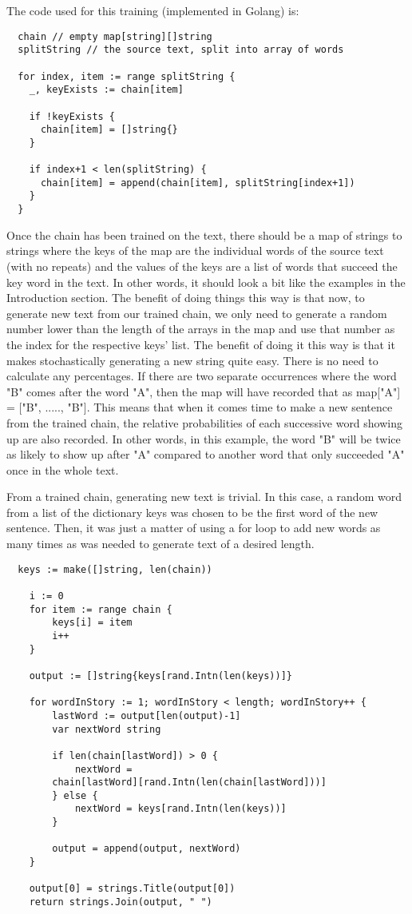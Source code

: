 \documentclass[11pt, a4paper]{article}
\begin{document}
  The code used for this training (implemented in Golang) is: \newline

  \begin{lstlisting}
  chain // empty map[string][]string
  splitString // the source text, split into array of words

  for index, item := range splitString {
    _, keyExists := chain[item]

    if !keyExists {
      chain[item] = []string{}
    }

    if index+1 < len(splitString) {
      chain[item] = append(chain[item], splitString[index+1])
    }
  }
  \end{lstlisting}

  Once the chain has been trained on the text, there should be a map of strings to strings where the keys of the map are the individual words of the source text (with no repeats) and the values of the keys are a list of words that succeed the key word in the text. In other words, it should look a bit like the examples in the Introduction section. The benefit of doing things this way is that now, to generate new text from our trained chain, we only need to generate a random number lower than the length of the arrays in the map and use that number as the index for the respective keys' list. The benefit of doing it this way is that it makes stochastically generating a new string quite easy. There is no need to calculate any percentages. If there are two separate occurrences where the word "B" comes after the word "A", then the map will have recorded that as map["A"] = ["B", ....., "B"]. This means that when it comes time to make a new sentence from the trained chain, the relative probabilities of each successive word showing up are also recorded. In other words, in this example, the word "B" will be twice as likely to show up after "A" compared to another word that only succeeded "A" once in the whole text.

  From a trained chain, generating new text is trivial. In this case, a random word from a list of the dictionary keys was chosen to be the first word of the new sentence. Then, it was just a matter of using a for loop to add new words as many times as was needed to generate text of a desired length.

  \begin{lstlisting}
  keys := make([]string, len(chain))

	i := 0
	for item := range chain {
		keys[i] = item
		i++
	}

	output := []string{keys[rand.Intn(len(keys))]}

	for wordInStory := 1; wordInStory < length; wordInStory++ {
		lastWord := output[len(output)-1]
		var nextWord string

		if len(chain[lastWord]) > 0 {
			nextWord =
        chain[lastWord][rand.Intn(len(chain[lastWord]))]
		} else {
			nextWord = keys[rand.Intn(len(keys))]
		}

		output = append(output, nextWord)
	}

	output[0] = strings.Title(output[0])
	return strings.Join(output, " ")
  \end{lstlisting}
\end{document}
